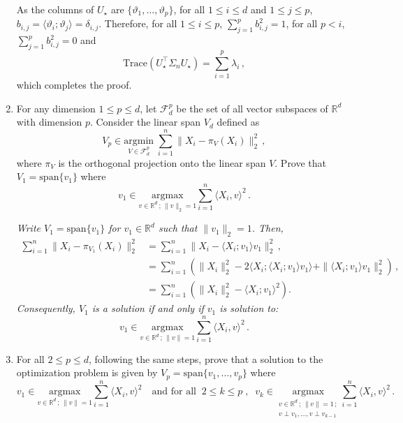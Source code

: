 \documentclass[a4paper,10pt,fleqn]{article}
\newcommand{\eqsp}{\,}
\newcommand{\calF}{\mathcal{F}}
\newcommand{\rset}{\ensuremath{\mathbb{R}}}
\newcommand{\1}{\ensuremath{\mathbbm{1}}}
\newcommand{\bfU}{U}
\newcommand{\bfs}{\Sigma}
\begin{document}
\begin{enumerate}
{As the columns of $\bfU_{\star}$ are $\{\vartheta_1,\ldots,\vartheta_p\}$, for all $1\leqslant i\leqslant d$ and $1\leqslant j \leqslant p$, $b_{i,j} = \langle \vartheta_i;\vartheta_j\rangle = \delta_{i,j}$. Therefore, for all $1\leqslant i\leqslant p$, $\sum_{j=1}^p b^2_{i,j} = 1$, for all $p < i$, $\sum_{j=1}^p b^2_{i,j} = 0$ and
$$
\mathrm{Trace}(\bfU^\top_{\star}\bfs_n \bfU_{\star}) =\sum_{i = 1}^p \lambda_i\eqsp,
$$
which completes the proof.
}
\item  For any dimension $1\leqslant p \leqslant  d$, let $\calF_d^p$ be the set of all vector subspaces of $\rset^d$ with dimension $p$. Consider the linear span $V_d$ defined as
$$
V_p \in \underset{V\in \calF_d^p}{\mathrm{argmin}} \;\sum_{i=1}^n\|X_i - \pi_V(X_i)\|_2^2\eqsp,
$$
where $\pi_V$ is the orthogonal projection onto the linear span $V$. Prove that $V_1 = \mathrm{span}\{v_1\}$ where
$$
v_1 \in \underset{v \in \rset^d\,;\, \|v\|_2=1}{\mathrm{argmax}} \sum_{i=1}^n   \langle X_i, v \rangle^2\eqsp.
$$

\vspace{.2cm}

{\em
Write $V_1 = \mathrm{span}\{v_1\}$ for $v_1\in \rset^d$ such that $\|v_1\|_2 = 1$. Then,
\begin{align*}
\sum_{i=1}^n\|X_i - \pi_{V_1}(X_i)\|_2^2 & = \sum_{i=1}^n\|X_i -  \langle X_i; v_1 \rangle v_1 \|_2^2\eqsp,\\
& = \sum_{i=1}^n \left( \|X_i\|_2^2 - 2 \langle X_i; \langle X_i; v_1 \rangle v_1 \rangle + \| \langle X_i; v_1 \rangle v_1 \|_2^2 \right)\eqsp,\\
& = \sum_{i=1}^n \left( \|X_i\|_2^2 -   \langle X_i; v_1 \rangle^2 \right).
\end{align*}
Consequently, $V_1$ is a solution  if and only if $v_1$ is solution to:
$$
v_1 \in \underset{v \in \rset^d\,;\, \|v\|=1}{\mathrm{argmax}} \sum_{i=1}^n   \langle X_i, v \rangle^2\eqsp.
$$
}
\item For all $2\leqslant p \leqslant d$, following the same steps, prove that a solution to the optimization problem is given by $V_p = \mathrm{span}\{v_1, \ldots, v_p\}$ where
\begin{equation}
\label{eq:vecpca}
v_1 \in \underset{v\in \rset^d\,;\,\|v\|=1}{\mathrm{argmax}} \sum_{i=1}^n\langle X_i,v\rangle^2 \quad\mbox{and for all}\;\; 2\leqslant k \leqslant p\;,\;\; v_k \in \underset{\substack{v\in \rset^d\,;\,\|v\|=1\,;\\ v\perp v_1,\ldots,v\perp v_{k-1}}}{\mathrm{argmax}}\sum_{i=1}^n\langle X_i,v\rangle^2\eqsp.
\end{equation}


\end{enumerate}
\end{document}
